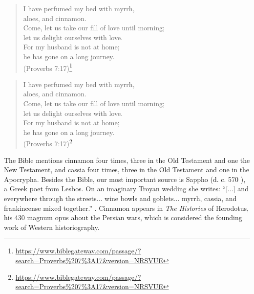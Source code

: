\begin{quote}
     I have perfumed my bed with myrrh, \\
    aloes, and cinnamon.\\
     Come, let us take our fill of love until morning;\\
    let us delight ourselves with love.\\
     For my husband is not at home;\\
    he has gone on a long journey.\\
    (Proverbs 7:17)\footnote{\url{https://www.biblegateway.com/passage/?search=Proverbs\%207\%3A17&version=NRSVUE}}
\end{quote}

\begin{verse}
     I have perfumed my bed with myrrh, \\
    aloes, and cinnamon.\\
     Come, let us take our fill of love until morning;\\
    let us delight ourselves with love.\\
     For my husband is not at home;\\
    he has gone on a long journey.\\
    (Proverbs 7:17)\footnote{\url{https://www.biblegateway.com/passage/?search=Proverbs\%207\%3A17&version=NRSVUE}}
\end{verse}

The Bible mentions cinnamon four times, three in the Old Testament and one the New Testament, and cassia four times, three in the Old Testament and one in the Apocrypha. Besides the Bible, our most important source is Sappho (d. c. 570 \BC), a Greek poet from Lesbos. On an imaginary Troyan wedding she writes: ``[...] and everywhere through the streets... wine bowls and goblets... myrrh, cassia, and frankincense mixed together.'' \parencite[49]{rayor_sappho_2014}. Cinnamon appears in \textit{The Histories} of Herodotus, his 430 \BC{} magnum opus about the Persian wars, which is considered the founding work of Western historiography.

